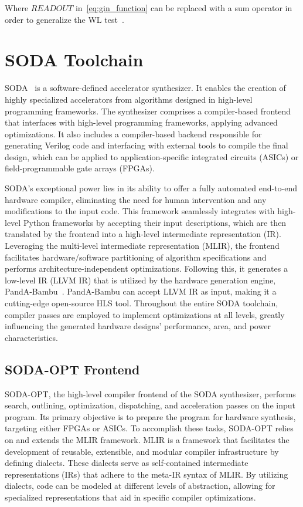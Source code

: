 Where $READOUT$ in~\ref{eq:gin_function} can be replaced with a sum operator in order to generalize the WL test~\cite{xu2019powerful}.


\section{SODA Toolchain}
\label{sec:soda}%

SODA~\cite{9786533} is a software-defined accelerator synthesizer.
It enables the creation of highly specialized accelerators from algorithms designed in high-level programming frameworks.
The synthesizer comprises a compiler-based frontend that interfaces with high-level programming frameworks, applying advanced optimizations.
It also includes a compiler-based backend responsible for generating Verilog code and interfacing with external tools to compile the final design, which can be applied to application-specific integrated circuits (ASICs) or field-programmable gate arrays (FPGAs).

SODA's exceptional power lies in its ability to offer a fully automated end-to-end hardware compiler, eliminating the need for human intervention and any modifications to the input code.
This framework seamlessly integrates with high-level Python frameworks by accepting their input descriptions, which are then translated by the frontend into a high-level intermediate representation (IR).
Leveraging the multi-level intermediate representation (MLIR), the frontend facilitates hardware/software partitioning of algorithm specifications and performs architecture-independent optimizations.
Following this, it generates a low-level IR (LLVM IR) that is utilized by the hardware generation engine, PandA-Bambu~\cite{9586110}.
PandA-Bambu can accept LLVM IR as input, making it a cutting-edge open-source HLS tool.
Throughout the entire SODA toolchain, compiler passes are employed to implement optimizations at all levels, greatly influencing the generated hardware designs' performance, area, and power characteristics.

\subsection{SODA-OPT Frontend}
\label{subsec:soda_frontend}%

SODA-OPT, the high-level compiler frontend of the SODA synthesizer, performs search, outlining, optimization, dispatching, and acceleration passes on the input program.
Its primary objective is to prepare the program for hardware synthesis, targeting either FPGAs or ASICs.
To accomplish these tasks, SODA-OPT relies on and extends the MLIR framework.
MLIR is a framework that facilitates the development of reusable, extensible, and modular compiler infrastructure by defining dialects.
These dialects serve as self-contained intermediate representations (IRs) that adhere to the meta-IR syntax of MLIR.
By utilizing dialects, code can be modeled at different levels of abstraction, allowing for specialized representations that aid in specific compiler optimizations.

